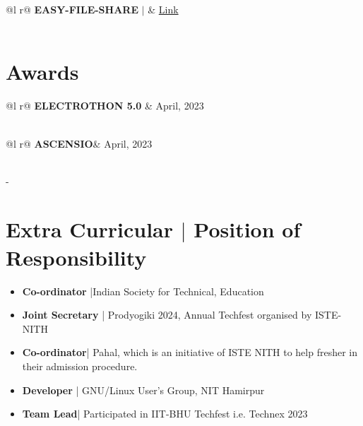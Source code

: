 \documentclass[legalpaper,11pt]{article}
\begin{document}
\begin{tabularx}{\linewidth}{ @{}l r@{} }
\textbf{EASY-FILE-SHARE} $|$  & \hfill \href{https://github.com/swastkk/Easy-File-Share}{Link} \\[3.75pt]
  \\
\end{tabularx}

\section{Awards}
\begin{tabularx}{\linewidth}{ @{}l r@{} }
\textbf{ELECTROTHON 5.0} & \hfill April, 2023 \\
 \\
\end{tabularx}
\begin{tabularx}{\linewidth}{ @{}l r@{} }
\textbf{ASCENSIO}& \hfill April, 2023 \\
 \\
\end{tabularx}
-

\section{Extra Curricular $|$ \normalsize{Position of Responsibility}}
\begin{itemize}[leftmargin=*]
    \item \textbf{Co-ordinator} |Indian Society for Technical, Education
    \item \textbf{Joint Secretary} | Prodyogiki 2024, Annual Techfest organised by ISTE-NITH
    \item \textbf{Co-ordinator}| Pahal, which is an initiative of ISTE NITH to help fresher in their admission procedure.
    \item \textbf {Developer} | GNU/Linux User's Group, NIT Hamirpur
    \item \textbf {Team Lead}| Participated in IIT-BHU Techfest i.e. Technex 2023

\end{itemize}
\end{document}
